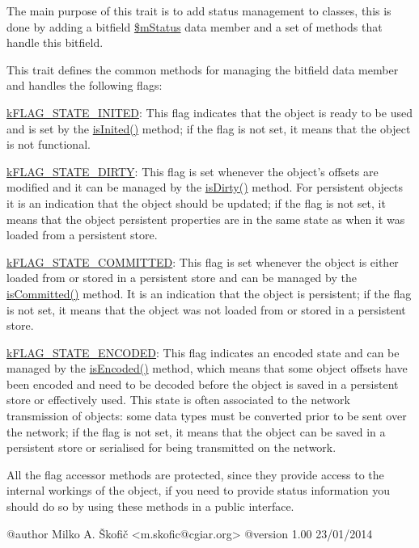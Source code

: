 The main purpose of this trait is to add status management to classes, this is done by adding a bitfield \hyperlink{}{\$m\-Status} data member and a set of methods that handle this bitfield.

This trait defines the common methods for managing the bitfield data member and handles the following flags\-:


\begin{DoxyItemize}
\item {\ttfamily \hyperlink{}{k\-F\-L\-A\-G\-\_\-\-S\-T\-A\-T\-E\-\_\-\-I\-N\-I\-T\-E\-D}}\-: This flag indicates that the object is ready to be used and is set by the \hyperlink{namespace_ontology_wrapper_a7c06300cb0043d3bab108f92cb9be3db}{is\-Inited()} method; if the flag is not set, it means that the object is not functional. 
\item {\ttfamily \hyperlink{}{k\-F\-L\-A\-G\-\_\-\-S\-T\-A\-T\-E\-\_\-\-D\-I\-R\-T\-Y}}\-: This flag is set whenever the object's offsets are modified and it can be managed by the \hyperlink{namespace_ontology_wrapper_ad6a1ce4470a565eb806bf842a2b38aaf}{is\-Dirty()} method. For persistent objects it is an indication that the object should be updated; if the flag is not set, it means that the object persistent properties are in the same state as when it was loaded from a persistent store. 
\item {\ttfamily \hyperlink{}{k\-F\-L\-A\-G\-\_\-\-S\-T\-A\-T\-E\-\_\-\-C\-O\-M\-M\-I\-T\-T\-E\-D}}\-: This flag is set whenever the object is either loaded from or stored in a persistent store and can be managed by the \hyperlink{namespace_ontology_wrapper_a76edb24c245971fe5fdb3163a6d947b0}{is\-Committed()} method. It is an indication that the object is persistent; if the flag is not set, it means that the object was not loaded from or stored in a persistent store. 
\item {\ttfamily \hyperlink{}{k\-F\-L\-A\-G\-\_\-\-S\-T\-A\-T\-E\-\_\-\-E\-N\-C\-O\-D\-E\-D}}\-: This flag indicates an encoded state and can be managed by the \hyperlink{namespace_ontology_wrapper_a401cbd03af9cceba713ab3e824c8fa98}{is\-Encoded()} method, which means that some object offsets have been encoded and need to be decoded before the object is saved in a persistent store or effectively used. This state is often associated to the network transmission of objects\-: some data types must be converted prior to be sent over the network; if the flag is not set, it means that the object can be saved in a persistent store or serialised for being transmitted on the network. 
\end{DoxyItemize}

All the flag accessor methods are protected, since they provide access to the internal workings of the object, if you need to provide status information you should do so by using these methods in a public interface. \begin{DoxyVerb} @author            Milko A. Škofič <m.skofic@cgiar.org>
 @version   1.00 23/01/2014\end{DoxyVerb}
 